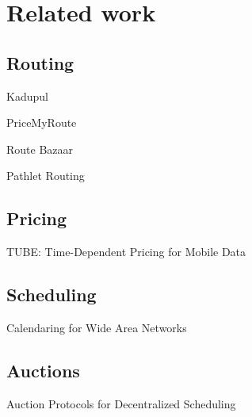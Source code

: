 \section{Related work}

\label{sec:related}

\subsection{Routing}

Kadupul \cite{kadupul15}

PriceMyRoute \cite{pricemyroute11}

Route Bazaar \cite{routebazaar15}

Pathlet Routing \cite{pathlet09}

\subsection{Pricing}

TUBE: Time-Dependent Pricing for Mobile Data \cite{tube12}

\subsection{Scheduling}

Calendaring for Wide Area Networks \cite{tempus14}

\subsection{Auctions}
Auction Protocols for Decentralized Scheduling \cite{wellman01}
